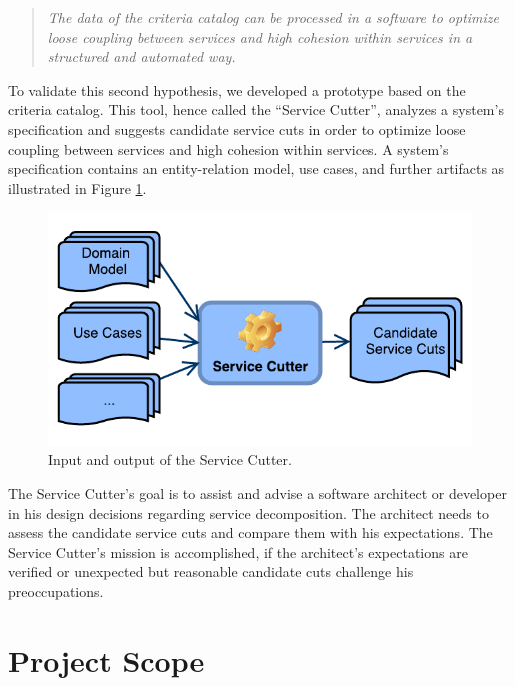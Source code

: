 \begin{quote}
	\textit{The data of the criteria catalog can be processed in a software to optimize loose coupling between services and high cohesion within services in a structured and automated way.}
\end{quote}

To validate this second hypothesis, we developed a prototype based on the criteria catalog. This tool, hence called the \enquote{Service Cutter}, analyzes a system's specification and suggests candidate service cuts in order to optimize loose coupling between services and high cohesion within services. A system's specification contains an entity-relation model, use cases, and further artifacts as illustrated in Figure \ref{fig:serviceCutterIO}.

\begin{figure}[H]
	\begin{center}
		\includegraphics[scale=1.1]{diagrams/systemContextDiagram.pdf}
	\end{center}
	\caption{Input and output of the Service Cutter.}
	\label{fig:serviceCutterIO}
\end{figure}

The Service Cutter's goal is to assist and advise a software architect or developer in his design decisions regarding service decomposition. The architect needs to assess the candidate service cuts and compare them with his expectations. The Service Cutter's mission is accomplished, if the architect's expectations are verified or unexpected but reasonable candidate cuts challenge his preoccupations. 

\section{Project Scope}

